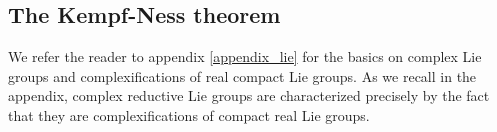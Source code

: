 



\subsection{The Kempf-Ness theorem}
We refer the reader to appendix \ref{appendix_lie} for the basics on complex Lie groups and complexifications of real compact Lie groups. As we recall in the appendix, complex reductive Lie groups are characterized precisely by the fact that they are complexifications of compact real Lie groups. \\


